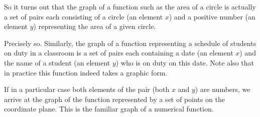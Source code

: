 {\rdr So it turns out that the graph of a function such as the area of a circle is actually a set of pairs each consisting of a circle (an element $x$) and a positive number (an element $y$) representing the area of a given circle.

\athr Precisely so. Similarly, the graph of a function representing a schedule of students on duty in a classroom is a set of pairs each containing a date (an element $x$) and the name of a student (an element $y$) who is on duty on this date. Note also that in practice this function indeed takes a graphic form.

If in a particular case both elements of the pair (both $x$ and $y$) are numbers, we arrive at the graph of the function represented by a set of points on the coordinate plane. This is the familiar graph of a numerical function.
}